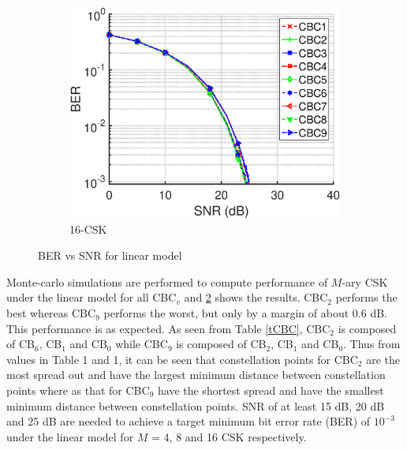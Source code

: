 \documentclass[10pt,letterpaper]{article}
\begin{document}
\begin{figure}[t]
\begin{subfigure}{0.49\textwidth}
		\centering
			\includegraphics[trim={0.1in 0.0in 0.6in 0.3in}, clip=true, width=\textwidth]{M16_16-CSK_BERvsSNR.eps}
			\caption{16-CSK}
			\label{fig16SNR}
		\end{subfigure}
	\caption{BER vs SNR for linear model}
	\label{figBERvsSNR}
\end{figure}

Monte-carlo simulations are performed to compute performance of $M$-ary CSK under the linear model for all CBC$_{v}$ and \figurename{ }\ref{figBERvsSNR} shows the results. CBC$_{2}$ performs the best whereas CBC$_{9}$ performs the worst, but only by a margin of about 0.6 dB. This performance is as expected. As seen from Table \ref{tCBC}, CBC$_{2}$ is composed of CB$_{6}$, CB$_{1}$ and CB$_{0}$ while CBC$_{9}$ is composed of CB$_{2}$, CB$_{1}$ and CB$_{0}$. Thus from values in Table 1 and \figurename{ }1, it can be seen that constellation points for CBC$_{2}$ are the most spread out and have the largest minimum distance between constellation points where as that for CBC$_{9}$ have the shortest spread and have the smallest minimum distance between constellation points. SNR of at least 15 dB, 20 dB and 25 dB are needed to achieve a target minimum bit error rate (BER) of $10^{-3}$ under the linear model for $M$ = 4, 8 and 16 CSK respectively.
\end{document}
